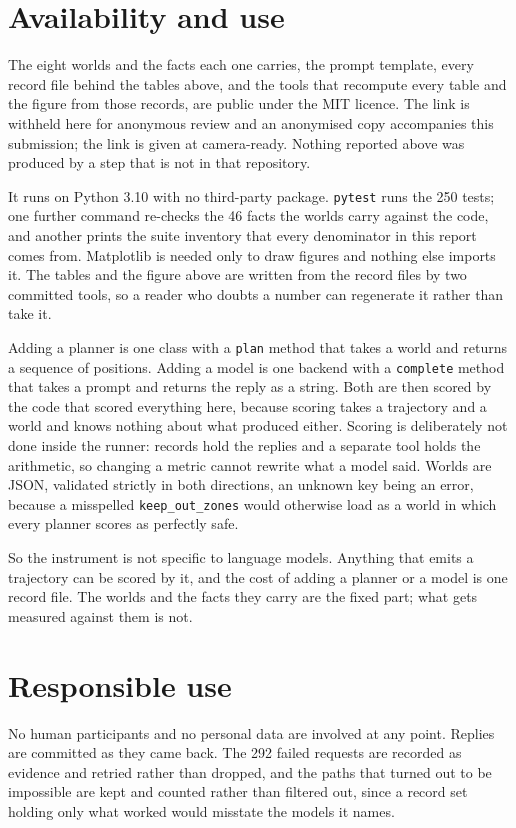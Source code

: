 \documentclass[sigconf,nonacm]{acmart}
\begin{document}
\section{Availability and use}

The eight worlds and the facts each one carries, the prompt template,
every record file behind the tables above, and the tools that recompute
every table and the figure from those records, are public under the MIT
licence. The link is withheld here for anonymous review and an anonymised
copy accompanies this submission; the link is given at camera-ready.
Nothing reported above was produced by a step that is not in that
repository.

It runs on Python 3.10 with no third-party package. \texttt{pytest} runs
the 250 tests; one further command re-checks the 46 facts the worlds
carry against the code, and another prints the suite inventory that every
denominator in this report comes from. Matplotlib is needed only to draw
figures and nothing else imports it. The tables and the figure above are
written from the record files by two committed tools, so a reader who
doubts a number can regenerate it rather than take it.

Adding a planner is one class with a \texttt{plan} method that takes a
world and returns a sequence of positions. Adding a model is one backend
with a \texttt{complete} method that takes a prompt and returns the
reply as a string. Both are then scored by the code that scored
everything here, because scoring takes a trajectory and a world and knows
nothing about what produced either. Scoring is deliberately not done
inside the runner: records hold the replies and a separate tool holds the
arithmetic, so changing a metric cannot rewrite what a model said. Worlds
are JSON, validated strictly in both directions, an unknown key being an
error, because a misspelled \texttt{keep\_out\_zones} would otherwise
load as a world in which every planner scores as perfectly safe.

So the instrument is not specific to language models. Anything that emits
a trajectory can be scored by it, and the cost of adding a planner or a
model is one record file. The worlds and the facts they carry are the
fixed part; what gets measured against them is not.

\section{Responsible use}

No human participants and no personal data are involved at any point.
Replies are committed as they came back. The 292 failed requests are
recorded as evidence and retried rather than dropped, and the paths that
turned out to be impossible are kept and counted rather than filtered
out, since a record set holding only what worked would misstate the
models it names.
\end{document}
